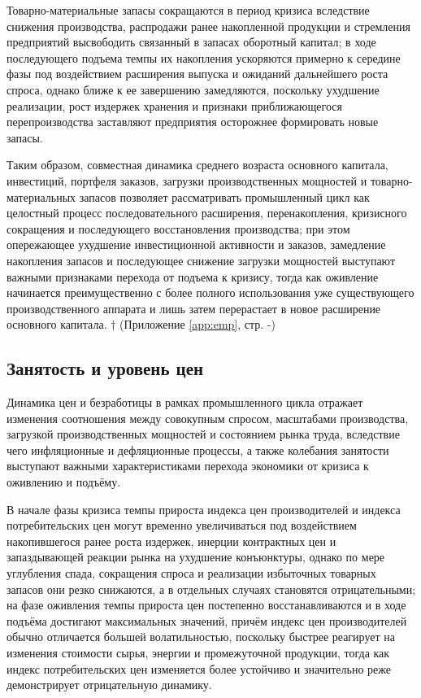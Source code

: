 Товарно-материальные запасы сокращаются в период кризиса вследствие снижения производства, распродажи ранее накопленной продукции и стремления предприятий высвободить связанный в запасах оборотный капитал; в ходе последующего подъема темпы их накопления ускоряются примерно к середине фазы под воздействием расширения выпуска и ожиданий дальнейшего роста спроса, однако ближе к ее завершению замедляются, поскольку ухудшение реализации, рост издержек хранения и признаки приближающегося перепроизводства заставляют предприятия осторожнее формировать новые запасы.

Таким образом, совместная динамика среднего возраста основного капитала, инвестиций, портфеля заказов, загрузки производственных мощностей и товарно-материальных запасов позволяет рассматривать промышленный цикл как целостный процесс последовательного расширения, перенакопления, кризисного сокращения и последующего восстановления производства; при этом опережающее ухудшение инвестиционной активности и заказов, замедление накопления запасов и последующее снижение загрузки мощностей выступают важными признаками перехода от подъема к кризису, тогда как оживление начинается преимущественно с более полного использования уже существующего производственного аппарата и лишь затем перерастает в новое расширение основного капитала. $\dagger$ (Приложение \ref{app:emp}, стр. \pageref{fig:average-age}-\pageref{fig:inventories})

\subsection{Занятость и уровень цен}
Динамика цен и безработицы в рамках промышленного цикла отражает изменения соотношения между совокупным спросом, масштабами производства, загрузкой производственных мощностей и состоянием рынка труда, вследствие чего инфляционные и дефляционные процессы, а также колебания занятости выступают важными характеристиками перехода экономики от кризиса к оживлению и подъёму.

В начале фазы кризиса темпы прироста индекса цен производителей и индекса потребительских цен могут временно увеличиваться под воздействием накопившегося ранее роста издержек, инерции контрактных цен и запаздывающей реакции рынка на ухудшение конъюнктуры, однако по мере углубления спада, сокращения спроса и реализации избыточных товарных запасов они резко снижаются, а в отдельных случаях становятся отрицательными; на фазе оживления темпы прироста цен постепенно восстанавливаются и в ходе подъёма достигают максимальных значений, причём индекс цен производителей обычно отличается большей волатильностью, поскольку быстрее реагирует на изменения стоимости сырья, энергии и промежуточной продукции, тогда как индекс потребительских цен изменяется более устойчиво и значительно реже демонстрирует отрицательную динамику.

